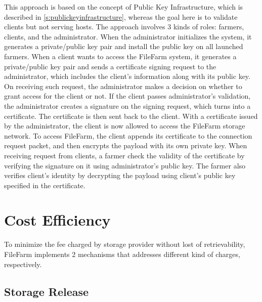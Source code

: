\newpage

This approach is based on the concept of Public Key Infrastructure, which is described in \ref{s:publickeyinfrastructure}, whereas the goal here is to validate clients but not serving hosts. The approach involves 3 kinds of roles: farmers, clients, and the administrator. When the administrator initializes the system, it generates a private/public key pair and install the public key on all launched farmers. When a client wants to access the FileFarm system, it generates a private/public key pair and sends a certificate signing request to the administrator, which includes the client's information along with its public key. On receiving such request, the administrator makes a decision on whether to grant access for the client or not. If the client passes administrator's validation, the administrator creates a signature on the signing request, which turns into a certificate. The certificate is then sent back to the client. With a certificate issued by the administrator, the client is now allowed to access the FileFarm storage network. To access FileFarm, the client appends its certificate to the connection request packet, and then encrypts the payload with its own private key. When receiving request from clients, a farmer check the validity of the certificate by verifying the signature on it using administrator's public key. The farmer also verifies client's identity by decrypting the payload using client's public key specified in the certificate.

\newpage

\section{Cost Efficiency}
\label{s:costefficiency}

To minimize the fee charged by storage provider without lost of retrievability, FileFarm implements 2 mechanisms that addresses different kind of charges, respectively.

\subsection{Storage Release}
\label{ss:storagerelease}

